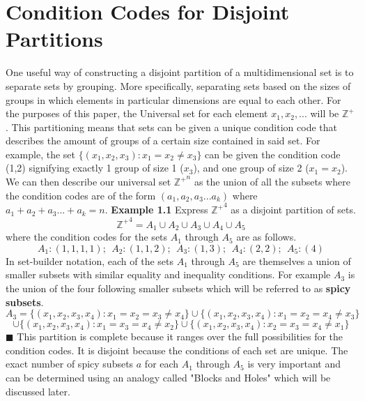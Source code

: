 \documentclass[12pt]{article}
\begin{document}
\section{Condition Codes for Disjoint Partitions}
One useful way of constructing a disjoint partition of a multidimensional set is to separate sets by grouping. More specifically, separating sets based on the sizes of groups in which elements in particular dimensions are equal to each other. For the purposes of this paper, the Universal set for each element \(x_1,x_2,...\) will be \(\mathbb{Z}^+\).\newline \newline
This partitioning means that sets can be given a unique condition code that describes the amount of groups of a certain size contained in said set. \newline
\newline
For example, the set \(\{(x_1,x_2,x_3):x_1=x_2\neq x_3\}\)
can be given the condition code (1,2) signifying exactly 1 group of size 1 (\(x_3\)), and one group of size 2 (\(x_1=x_2\)). \newline \newline
We can then describe our universal set \({\mathbb{Z}^+}^n\) as the union of all the subsets where the condition codes are of the form \((a_1,a_2,a_3...a_k)\) where \(a_1+a_2+a_3...+a_k=n\). \newline \newline
\textbf{Example 1.1} \newline
Express \({\mathbb{Z}^+}^4\) as a disjoint partition of sets.
\newline
\[{\mathbb{Z}^+}^4=A_1\cup A_2\cup A_3\cup A_4\cup A_5\]
where the condition codes for the sets \(A_1\) through \(A_5\) are as follows.
\[A_1:(1,1,1,1);\ \ A_2:(1,1,2);\ \ A_3:(1,3);\ \ A_4:(2,2);\ \ A_5:(4)\]
In set-builder notation, each of the sets \(A_1\) through \(A_5\) are themselves a union of smaller subsets with similar equality and inequality conditions. For example \(A_3\) is the union of the four following smaller subsets which will be referred to as \textbf{spicy subsets}.
\[A_3=\{(x_1,x_2,x_3,x_4):x_1=x_2=x_3\neq x_4\}\cup\{(x_1,x_2,x_3,x_4):x_1=x_2=x_4\neq x_3\}\]\[\cup\{(x_1,x_2,x_3,x_4):x_1=x_3=x_4\neq x_2\}\cup\{(x_1,x_2,x_3,x_4):x_2=x_3=x_4\neq x_1\}\]
\(\blacksquare\) \newline \newline
This partition is complete because it ranges over the full possibilities for the condition codes. It is disjoint because the conditions of each set are unique. \newline \newline
The exact number of spicy subsets \(a\) for each \(A_1\) through \(A_5\) is very important and can be determined using an analogy called "Blocks and Holes" which will be discussed later.
\end{document}

